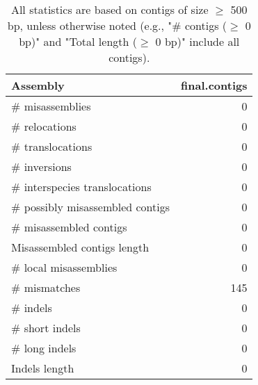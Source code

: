 \documentclass[12pt,a4paper]{article}
\begin{document}
\begin{table}[ht]
\begin{center}
\caption{All statistics are based on contigs of size $\geq$ 500 bp, unless otherwise noted (e.g., "\# contigs ($\geq$ 0 bp)" and "Total length ($\geq$ 0 bp)" include all contigs).}
\begin{tabular}{|l*{1}{|r}|}
\hline
Assembly & final.contigs \\ \hline
\# misassemblies & 0 \\ \hline
\hspace{5mm}\# relocations & 0 \\ \hline
\hspace{5mm}\# translocations & 0 \\ \hline
\hspace{5mm}\# inversions & 0 \\ \hline
\hspace{5mm}\# interspecies translocations & 0 \\ \hline
\# possibly misassembled contigs & 0 \\ \hline
\# misassembled contigs & 0 \\ \hline
Misassembled contigs length & 0 \\ \hline
\# local misassemblies & 0 \\ \hline
\# mismatches & 145 \\ \hline
\# indels & 0 \\ \hline
\hspace{5mm}\# short indels & 0 \\ \hline
\hspace{5mm}\# long indels & 0 \\ \hline
Indels length & 0 \\ \hline
\end{tabular}
\end{center}
\end{table}
\end{document}
